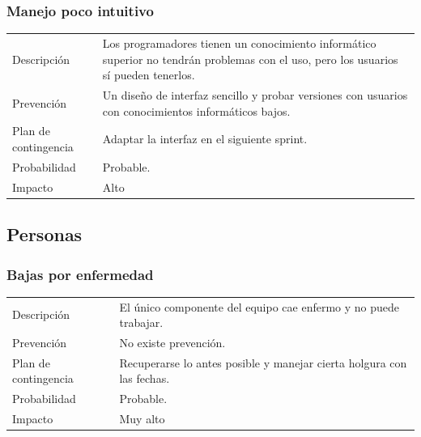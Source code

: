 \subsubsection{Manejo poco intuitivo}
\begin{table}[H]
    \begin{center}
        \begin{tabular}{l p{8cm}}
            Descripci\'{o}n                 & Los  programadores  tienen  un  conocimiento
            inform\'{a}tico superior no tendr\'{a}n problemas con el uso, pero los usuarios s\'i pueden tenerlos.\\
            Prevenci\'{o}n                  & Un diseño de interfaz sencillo y probar versiones con
            usuarios con conocimientos inform\'{a}ticos bajos. \\ 
            Plan de contingencia            & Adaptar la interfaz en el siguiente sprint. \\
            Probabilidad                    & Probable. \\
            Impacto                         & Alto \\
        \end{tabular}
    \end{center}
    
\end{table}

\subsection{Personas}
\subsubsection{Bajas por enfermedad}
\begin{table}[H]
    \begin{center}
        \begin{tabular}{l p{8cm}}
            Descripci\'{o}n                 & El \'{u}nico componente del equipo cae enfermo y no puede trabajar. \\
            Prevenci\'{o}n                  & No existe prevenci\'{o}n. \\ 
            Plan de contingencia            & Recuperarse lo antes posible y manejar cierta holgura con las fechas.\\
            Probabilidad                    & Probable. \\
            Impacto                         & Muy alto \\
        \end{tabular}
    \end{center}
    
\end{table}

